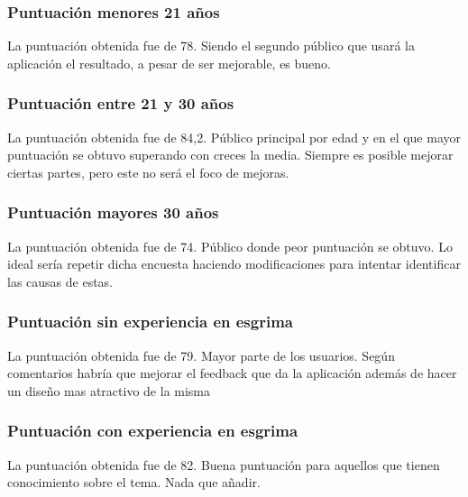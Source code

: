 \subsubsection{Puntuación menores 21 años}
La puntuación obtenida fue de 78. Siendo el segundo público que usará la aplicación
el resultado, a pesar de ser mejorable, es bueno.

\subsubsection{Puntuación entre 21 y 30 años}
La puntuación obtenida fue de 84,2. Público principal por edad y en el que mayor
puntuación se obtuvo superando con creces la media. Siempre es posible mejorar
ciertas partes, pero este no será el foco de mejoras.

\subsubsection{Puntuación mayores 30 años}
La puntuación obtenida fue de 74. Público donde peor puntuación se obtuvo.
Lo ideal sería repetir dicha encuesta haciendo modificaciones para
intentar identificar las causas de estas.

\subsubsection{Puntuación sin experiencia en esgrima}
La puntuación obtenida fue de 79. Mayor parte de los usuarios.
Según comentarios habría que mejorar el feedback que da la aplicación
además de hacer un diseño mas atractivo de la misma

\subsubsection{Puntuación con experiencia en esgrima}
La puntuación obtenida fue de 82. Buena puntuación para aquellos
que tienen conocimiento sobre el tema. Nada que añadir.



